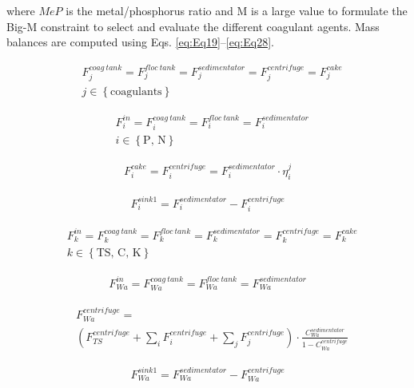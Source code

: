 \begin{refsection}[referencesCh2]
where $MeP$ is the metal/phosphorus ratio and M is a large value to formulate the Big-M constraint to select and evaluate the different coagulant agents. Mass balances are computed using Eqs. \ref{eq:Eq19}–\ref{eq:Eq28}.

\begin{align}
	& F_j^{{{coag \ tank}}} = F_j^{{{floc \ tank}}} = F_j^{{{sedimentator}}} = F_j^{{{centrifuge}}} = F_j^{{{cake}}} \label{eq:Eq19}\\
	& j \in \left\{ \text{coagulants} \right\} \nonumber
\end{align}

\begin{align}
	& F_i^{in} = F_i^{{{coag \ tank}}} = F_i^{{{floc \ tank}}} = F_i^{{{sedimentator}}} \label{eq:Eq20} \\
	& {i} \in \left\{ \text{P, N} \right\} \nonumber
\end{align}

\begin{align}
	F_i^{cake} = F_i^{centrifuge} = F_i^{{{sedimentator}}} \cdot \eta_i^j \label{eq:Eq21}
\end{align}

\begin{align}
	F_i^{{{sink1}}} = F_i^{{{sedimentator}}} - F_i^{{{centrifuge}}} \label{eq:Eq22}
\end{align}

\begin{align}
	& F_k^{in} = F_k^{{{coag \ tank}}} = F_k^{{{floc \ tank}}} = F_k^{{{sedimentator}}} = F_k^{{{centrifuge}}} = {{F}}_{{k}}^{{{cake}}} \label{eq:Eq23} \\
	& {{k}} \in \left\{ \text{TS, C, K} \right\} \nonumber
\end{align}

\begin{align}
	F_{Wa}^{in} = F_{Wa}^{{{coag \ tank}}} = F_{Wa}^{{{floc \ tank}}} = F_{Wa}^{{{sedimentator}}} \label{eq:Eq24}
\end{align}

\begin{align}
	& {F}_{{Wa}}^{centrifuge} = \label{eq:Eq25} \\
	& \left( {{F}_{TS}^{centrifuge} + \sum\limits_i {{F}_i^{centrifuge} + \sum\limits_j {F}_j^{centrifuge}} }  \right) \cdot \frac{{C_{Wa}^{sedimentator}}}{1 - C_{Wa}^{centrifuge}} \nonumber
\end{align}

\begin{align}
	{F}_{Wa}^{sink1} = F_{Wa}^{sedimentator} - {F}_{Wa}^{centrifuge} \label{eq:Eq26}
\end{align}


\end{refsection}
